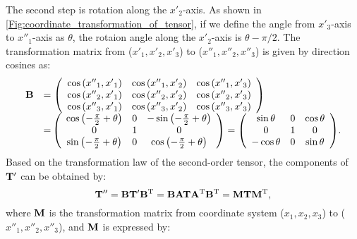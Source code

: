 The second step is rotation along the $x'_2$-axis. As shown in \ref{Fig:coordinate_transformation_of_tensor}, if we define the angle from $x'_3$-axis to $x''_1$-axis as $\theta$, the rotaion angle along the $x'_2$-axis is $\theta-{\pi}/{2}$. The transformation matrix from ($x'_1,x'_2,x'_3$) to ($x''_1,x''_2,x''_3$) is given by direction cosines as:
\begin{eqnarray}
\begin{array}{*{20}{l}}
{\bf{B}}&{ = \left( {\begin{array}{*{20}{c}}
{\cos \left( {{{x''}_1},{{x'}_1}} \right)}&{\cos \left( {{{x''}_1},{{x'}_2}} \right)}&{\cos \left( {{{x''}_1},{{x'}_3}} \right)}\\
{\cos \left( {{{x''}_2},{{x'}_1}} \right)}&{\cos \left( {{{x''}_2},{{x'}_2}} \right)}&{\cos \left( {{{x''}_2},{{x'}_3}} \right)}\\
{\cos \left( {{{x''}_3},{{x'}_1}} \right)}&{\cos \left( {{{x''}_3},{{x'}_2}} \right)}&{\cos \left( {{{x''}_3},{{x'}_3}} \right)}
\end{array}} \right)}\\
{}&{{\rm{ = }}\left( {\begin{array}{*{20}{c}}
{\cos \left( { - \frac{{{\mkern 1mu} \pi }}{2} + \theta } \right)}&0&{ - \sin \left( { - \frac{{{\mkern 1mu} \pi }}{2} + \theta } \right)}\\
0&1&0\\
{\sin \left( { - \frac{{{\mkern 1mu} \pi }}{2} + \theta } \right)}&0&{\cos \left( { - \frac{{{\mkern 1mu} \pi }}{2} + \theta } \right)}
\end{array}} \right) = \left( {\begin{array}{*{20}{c}}
{\sin \theta }&0&{\cos \theta }\\
0&1&0\\
{ - \cos \theta }&0&{\sin \theta }
\end{array}} \right)}.
\end{array}
\end{eqnarray}
Based on the transformation law of the second-order tensor, the components of ${\bf{T'}}$ can be obtained by:
\begin{equation}
{\bf{T''}} = {\bf{BT'}}{{\bf{B}}^{\rm{T}}} = {\bf{BAT}}{{\bf{A}}^{\rm{T}}}{{\bf{B}}^{\rm{T}}} = {\bf{MT}}{{\bf{M}}^{\rm{T}}},
\label{Equ:two_step_rotation}
\end{equation}
where ${\bf{M}}$ is the transformation matrix from coordinate system ($x_1,x_2,x_3$) to ($x''_1,x''_2,x''_3$), and ${\bf{M}}$ is expressed by:
